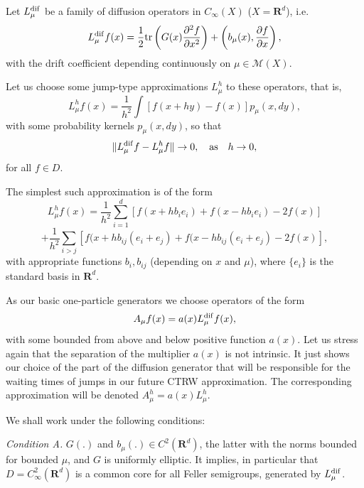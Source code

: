\documentclass[12pt]{article}
\def\MC{\mathcal{M}}
\def\R{\mathbf{R}}
\def\tr{\rm{tr}}
\def\pa{\partial}
\numberwithin{equation}{section}
\begin{document}
Let $L^{\rm dif}_{\mu}$ be a family of diffusion operators in $C_{\infty}(X)$ ($X=\R^d$), i.e.
\begin{equation}
\label{diffone}
L_{\mu}^{\rm dif}f(x) =\frac12 {\tr} \left(G(x) \frac{\pa^2 f}{\pa x^2}\right)
+\left(b_{\mu}(x), \frac{\pa f}{\pa x}\right),
\end{equation}
with the drift coefficient depending continuously
on $\mu\in \MC(X)$.

 Let us choose some jump-type approximations $L^h_{\mu}$ to these operators, that is,
 \begin{equation}
\label{diffoneapp0}
L_{\mu}^hf(x)=\frac{1}{h^2}\int [f(x+hy)-f(x)] p_{\mu}(x,dy),
\end{equation}
with some probability kernels $p_{\mu}(x,dy)$,
  so that
\begin{equation}
\label{diffoneapp}
\|L_{\mu}^{\rm dif}f-L_{\mu}^{h}f\| \to 0, \quad \text{as} \quad h\to 0,
\end{equation}
for all $f\in D$.

The simplest such approximation is of the form
\[
L_{\mu}^hf(x)=\frac{1}{h^2}\sum_{i=1}^d [f(x+hb_ie_i)+f(x-hb_ie_i)-2f(x)]
\]
\begin{equation}
\label{diffoneapp1}
+\frac{1}{h^2}\sum_{i>j}[f(x+hb_{ij}(e_i+e_j)+f(x-hb_{ij}(e_i+e_j)-2f(x)],
 \end{equation}
with appropriate functions $b_i, b_{ij}$ (depending on $x$ and $\mu$),
where $\{e_i\}$ is the standard basis in $\R^d$.

As our basic one-particle generators we choose operators of the form
\begin{equation}
\label{diffonefi}
A_{\mu}f(x)=a(x) L_{\mu}^{\rm dif}f(x),
\end{equation}
with some  bounded from above and below positive function $a(x)$. Let us stress again that the separation
of the multiplier $a(x)$ is not intrinsic. It just shows our choice of the part of the diffusion generator that
will be responsible for the waiting times of jumps in our future CTRW approximation. The corresponding approximation
will be denoted $A^h_{\mu}=a(x) L^h_{\mu}$.

 We shall work under the following conditions:

{\it Condition A.} $G(.)$ and $b_{\mu}(.)\in C^2(\R^d)$, the latter with the norms bounded for bounded $\mu$,
and $G$ is uniformly elliptic. It implies, in particular that
$D=C^2_{\infty}(\R^d)$ is a common core for all Feller semigroups, generated by $L^{\rm dif}_{\mu}$.
\end{document}
